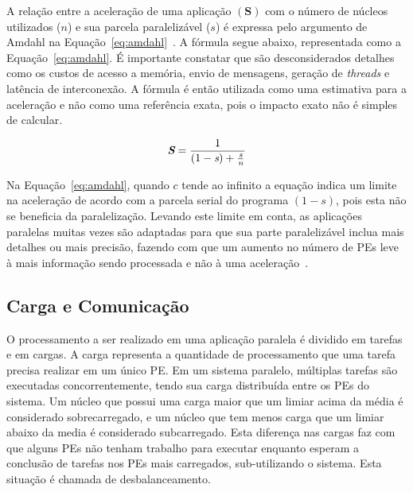 \documentclass[
	12pt,				%
	openright,			%
	twoside,			%
	a4paper,			%
	english,			%
	brazil,				%
	]{abntex2}
\begin{document}
A relação entre a aceleração de uma aplicação $(\textbf{S})$ com o número de núcleos utilizados ($n$) e sua parcela paralelizável ($s$) é expressa pelo argumento de Amdahl na Equação~\ref{eq:amdahl}~\cite{amdahl}. A fórmula segue abaixo, representada como a Equação~\ref{eq:amdahl}. É importante constatar que são desconsiderados detalhes como os custos de acesso a memória, envio de mensagens, geração de \textit{threads} e latência de interconexão. A fórmula é então utilizada como uma estimativa para a aceleração e não como uma referência exata, pois o impacto exato não é simples de calcular.

\begin{equation}
\textit{\textbf{S}} = \frac{1}{(1-\textit{s}) + \frac{\textit{s}}{\textit{n}}}
\label{eq:amdahl}
\end{equation}

Na Equação~\ref{eq:amdahl}, quando $c$ tende ao infinito a equação indica um limite na aceleração de acordo com a parcela serial do programa $(1-s)$, pois esta não se beneficia da paralelização. 
Levando este limite em conta, as aplicações paralelas muitas vezes são adaptadas para que sua parte paralelizável inclua mais detalhes ou mais precisão, fazendo com que um aumento no número de PEs leve à mais informação sendo processada e não à uma aceleração~\cite{gustafson}.

\subsection{Carga e Comunicação}

O processamento a ser realizado em uma aplicação paralela é dividido em tarefas e em cargas. 
A carga representa a quantidade de processamento que uma tarefa precisa realizar em um único PE. 
Em um sistema paralelo, múltiplas tarefas são executadas concorrentemente, tendo sua carga distribuída entre os PEs do sistema. 
Um núcleo que possui uma carga maior que um limiar acima da média é considerado sobrecarregado, e um núcleo que tem menos carga que um limiar abaixo da media é considerado subcarregado. 
Esta diferença nas cargas faz com que alguns PEs não tenham trabalho para executar enquanto esperam a conclusão de tarefas nos PEs mais carregados, sub-utilizando o sistema. 
Esta situação é chamada de desbalanceamento.
\end{document}
